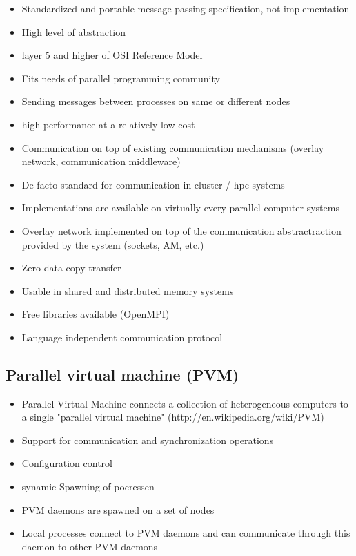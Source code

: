 \begin{itemize}
\item Standardized and portable message-passing \cite{ref:mp} specification, not implementation
\item High level of abstraction
\item layer 5 and higher of OSI Reference Model
\item Fits needs of parallel programming community
\item Sending messages between processes on same or different nodes
\item high performance at a relatively low cost

\item Communication on top of existing communication mechanisms
  (overlay network, communication middleware)
\item De facto standard for communication in cluster / hpc systems
\item Implementations are available on virtually every parallel
  computer systems
\item Overlay network implemented on top of the communication
  abstractraction provided by the system (sockets, AM, etc.)
\item Zero-data copy transfer
\item Usable in shared and distributed memory systems
\item Free libraries available (OpenMPI)
\item Language independent communication protocol
\end{itemize}

\subsection{Parallel virtual machine (PVM)}
\label{sec:pvm}
\begin{itemize}
\item Parallel Virtual Machine connects a collection of heterogeneous computers
  to a single "parallel virtual machine"
  (http://en.wikipedia.org/wiki/PVM)
\item Support for communication and synchronization operations
\item Configuration control
\item synamic Spawning of pocressen
\item PVM daemons are spawned on a set of nodes
\item Local processes connect to PVM daemons and can 
  communicate through this daemon to other PVM daemons
\end{itemize}

